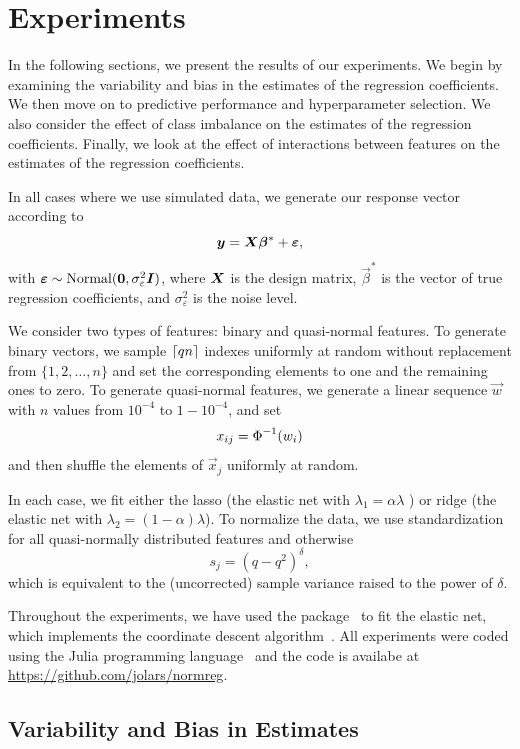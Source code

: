 \section{Experiments}
\label{sec:experiments}

In the following sections, we present the results of our experiments. We begin by examining the variability and bias in the estimates of the regression coefficients. We then move on to predictive performance and hyperparameter selection. We also consider the effect of class imbalance on the estimates of the regression coefficients. Finally, we look at the effect of interactions between features on the estimates of the regression coefficients.

In all cases where we use simulated data, we generate our response vector according to
\[
  \boldsymbol{y} = \boldsymbol{X}\boldsymbol{\beta}^* + \boldsymbol{\varepsilon},
\]
with \(\boldsymbol{\varepsilon} \sim \operatorname{Normal}(\boldsymbol{0}, \sigma_\varepsilon^2 \boldsymbol{I})\), where \(\boldsymbol{X}\) is the design matrix, \(\vec{\beta}^*\) is the vector of true regression coefficients, and \(\sigma_\varepsilon^2\) is the noise level.

We consider two types of features: binary and quasi-normal features.
To generate binary vectors, we sample \(\lceil qn \rceil\) indexes uniformly at random without replacement from \(\{1,2,\dots,n\}\) and set the corresponding elements to one and the remaining ones to zero.
To generate quasi-normal features, we generate a linear sequence \(\vec{w}\) with \(n\) values from  \(10^{-4}\) to \(1 - 10^{-4}\), and set
\[
  x_{ij} = \operatorname{\Phi}^{-1}(w_i)
\]
and then shuffle the elements of \(\vec{x}_j\) uniformly at random.

In each case, we fit either the lasso (the elastic net with \(\lambda_1 = \alpha \lambda\) ) or ridge (the elastic net with \(\lambda_2 = (1 - \alpha)\lambda\)). To normalize the data, we use
standardization for all quasi-normally distributed features and otherwise
\[
  s_j = (q - q^2)^\delta,
\]
which is equivalent to the (uncorrected) sample variance raised to the power of \(\delta\).

Throughout the experiments, we have used the  package~\citep{kornblith2024} to fit the elastic net, which implements the coordinate descent algorithm~\citep{friedman2010}.
All experiments were coded using the Julia programming language~\citep{bezanson2017} and the code is availabe at \url{https://github.com/jolars/normreg}.

\subsection{Variability and Bias in Estimates}\label{sec:experiments-varbias}

